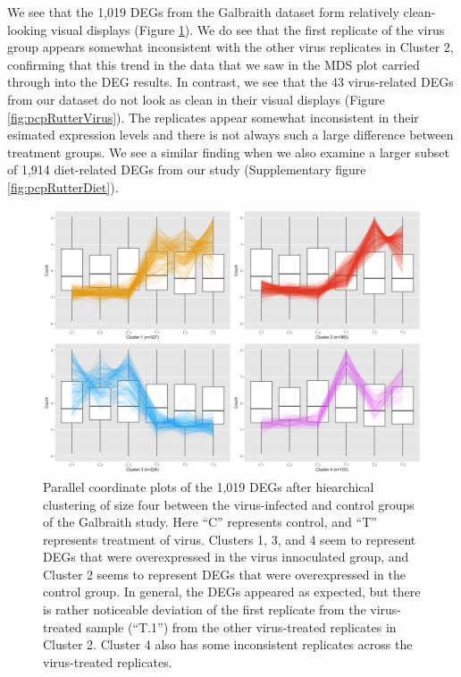 \documentclass[11pt,a4paper,oldfontcommands,openany]{memoir}
\numberwithin{equation}{section} %
\begin{document}
We see that the 1,019 DEGs from the Galbraith dataset form relatively clean-looking visual displays (Figure \ref{fig:pcpGalbraith}). We do see that the first replicate of the virus group appears somewhat inconsistent with the other virus replicates in Cluster 2, confirming that this trend in the data that we saw in the MDS plot carried through into the DEG results. In contrast, we see that the 43 virus-related DEGs from our dataset do not look as clean in their visual displays (Figure \ref{fig:pcpRutterVirus}). The replicates appear somewhat inconsistent in their esimated expression levels and there is not always such a large difference between treatment groups. We see a similar finding when we also examine a larger subset of 1,914 diet-related DEGs from our study (Supplementary figure \ref{fig:pcpRutterDiet}). 

\begin{figure}[H]
\centering
\begin{framed}
  \includegraphics[width=\textwidth]{Images/C_T_4.jpg}
  \end{framed}
  \caption{Parallel coordinate plots of the 1,019 DEGs after hiearchical clustering of size four between the virus-infected and control groups of the Galbraith study. Here ``C'' represents control, and ``T'' represents treatment of virus. Clusters 1, 3, and 4 seem to represent DEGs that were overexpressed in the virus innoculated group, and Cluster 2 seems to represent DEGs that were overexpressed in the control group. In general, the DEGs appeared as expected, but there is rather noticeable deviation of the first replicate from the virus-treated sample (``T.1'') from the other virus-treated replicates in Cluster 2. Cluster 4 also has some inconsistent replicates across the virus-treated replicates.}
  \label{fig:pcpGalbraith}
\end{figure}
\end{document}
